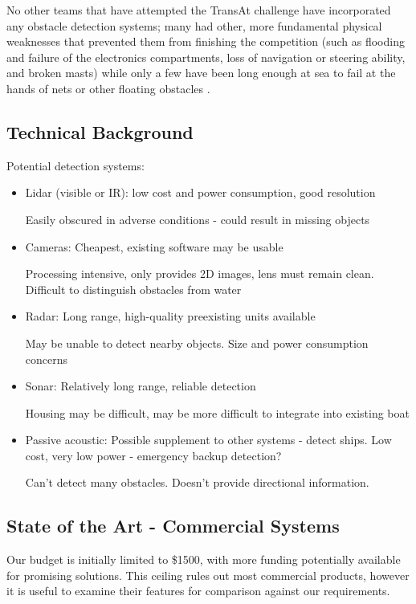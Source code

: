 No other teams that have attempted the TransAt challenge have incorporated any obstacle detection systems; many had other, more fundamental physical weaknesses that prevented them from finishing the competition (such as flooding and failure of the electronics compartments, loss of navigation or steering ability, and broken masts) while only a few have been long enough at sea to fail at the hands of nets or other floating obstacles \cite{transat-history}.


\subsection{\label{sec:intro:technical-background}Technical Background}
Potential detection systems:
\begin{itemize}

\item Lidar (visible or IR): 
low cost and power consumption, good resolution

Easily obscured in adverse conditions - could result in missing objects

\item Cameras: 
Cheapest, existing software may be usable

Processing intensive, only provides 2D images, lens must remain clean.  Difficult to distinguish obstacles from water

\item Radar:
Long range, high-quality preexisting units available

May be unable to detect nearby objects.  Size and power consumption concerns

\item Sonar:
Relatively long range, reliable detection

Housing may be difficult, may be more difficult to integrate into existing boat

\item Passive acoustic:
Possible supplement to other systems - detect ships.  Low cost, very low power - emergency backup detection?

Can't detect many obstacles.  Doesn't provide directional information.
\end{itemize}


\subsection{\label{sec:intro:commercial}State of the Art - Commercial Systems}
Our budget is initially limited to \$1500, with more funding potentially available for promising solutions. This ceiling rules out most commercial products, however it is useful to examine their features for comparison against our requirements.

